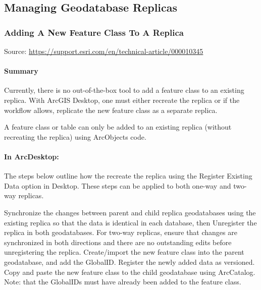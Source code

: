 \documentclass[class=article , crop=false, titlepage, twoside, multi={itemize, figure, verbatim}, float=false]{standalone}
\title{}  %
\begin{document}


\ifstandalone
\maketitle %
\tableofcontents %
\clearpage
\fi

\subsection{Managing Geodatabase Replicas}
\medskip 
\subsubsection[Adding A New Feature Class To A Replica]{\Large Adding A New Feature Class To A Replica}

Source:
\href{https://support.esri.com/en/technical-article/000010345}{https://support.esri.com/en/technical-article/000010345}

\paragraph{Summary \texorpdfstring{\\}{}}
Currently, there is no out-of-the-box tool to add a feature class to an existing replica. With ArcGIS Desktop, one must either recreate the replica or if the workflow allows, replicate the new feature class as a separate replica.

A feature class or table can only be added to an existing replica (without recreating the replica) using ArcObjects code.

\paragraph{In ArcDesktop:\texorpdfstring{\\}{}}

The steps below outline how the recreate the replica using the Register Existing Data option in Desktop. These steps can be applied to both one-way and two-way replicas.


Synchronize the changes between parent and child replica geodatabases using the existing replica so that the data is identical in each database, then Unregister the replica in both geodatabases. For two-way replicas, ensure that changes are synchronized in both directions and there are no outstanding edits before unregistering the replica.
Create/import the new feature class into the parent geodatabase, and add the GlobalID.
Register the newly added data as versioned.
Copy and paste the new feature class to the child geodatabase using ArcCatalog. 
Note:
 that the GlobalIDs must have already been added to the feature class.
\end{document}

